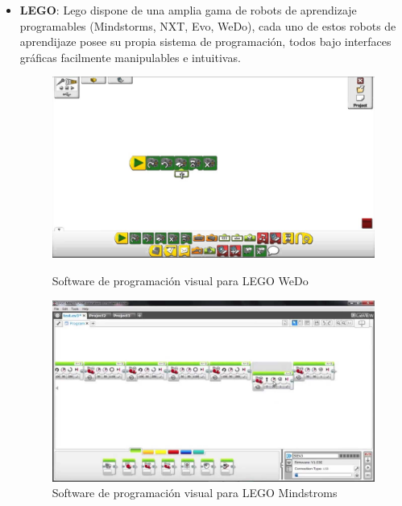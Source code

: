 \begin{itemize}
\item \textbf{LEGO}: Lego dispone de una amplia gama de robots de aprendizaje programables (Mindstorms, NXT, Evo, WeDo), cada uno de estos robots de aprendijaze posee su propia sistema de programación, todos bajo interfaces gráficas facilmente manipulables e intuitivas.\\
\begin{figure}[H]
	\begin{minipage}{0.48\textwidth}
    	\centering
     	\includegraphics[scale=0.15]{img/lego-wedo.jpg}
  		\caption{Software de programación visual para LEGO WeDo}
  		\label{fig:lego-wedo}
   	\end{minipage}\hfill
   	\begin {minipage}{0.48\textwidth}
     	\centering
     	\includegraphics[scale=0.15]{img/lego-mindstorms.jpg}
     	\caption{Software de programación visual para LEGO Mindstroms}
     	\label{fig:lego-mindstorms}
	\end{minipage}
\end{figure}


\end{itemize}
